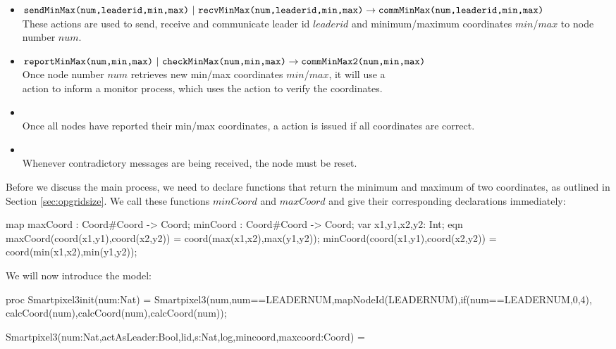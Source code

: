 \begin{itemize}
\item $\texttt{sendMinMax(num,leaderid,min,max)} ~|~ \texttt{recvMinMax(num,leaderid,min,max)} \\
       \rightarrow \texttt{commMinMax(num,leaderid,min,max)}$ \\
These actions are used to send, receive and communicate leader id $leaderid$ and minimum/maximum coordinates $min$/$max$ to node number $num$.
\item $\texttt{reportMinMax(num,min,max)} ~|~ \texttt{checkMinMax(num,min,max)} \\
       \rightarrow \texttt{commMinMax2(num,min,max)}$ \\
Once node number $num$ retrieves new min/max coordinates $min$/$max$, it will use a \\
 action to inform a monitor process, which uses the  action to verify the coordinates. 
\item {} \\
Once all nodes have reported their min/max coordinates, a  action is issued if all coordinates are correct.
\item {} \\
Whenever contradictory messages are being received, the node must be reset.
\end{itemize}

Before we discuss the main process, we need to declare functions that return the minimum and maximum of two coordinates, as outlined in Section \ref{sec:opgridsize}. We call these functions $minCoord$ and $maxCoord$ and give their corresponding declarations immediately:

\begin{codeverb}
map     maxCoord : Coord#Coord -> Coord;
        minCoord : Coord#Coord -> Coord;
var     x1,y1,x2,y2: Int;
eqn     maxCoord(coord(x1,y1),coord(x2,y2)) = coord(max(x1,x2),max(y1,y2));
        minCoord(coord(x1,y1),coord(x2,y2)) = coord(min(x1,x2),min(y1,y2));
\end{codeverb}

We will now introduce the model:

\begin{codeverb}
proc    Smartpixel3init(num:Nat) =
         Smartpixel3(num,num==LEADERNUM,mapNodeId(LEADERNUM),if(num==LEADERNUM,0,4),
                     calcCoord(num),calcCoord(num),calcCoord(num));

        Smartpixel3(num:Nat,actAsLeader:Bool,lid,s:Nat,log,mincoord,maxcoord:Coord) =
\end{codeverb}

